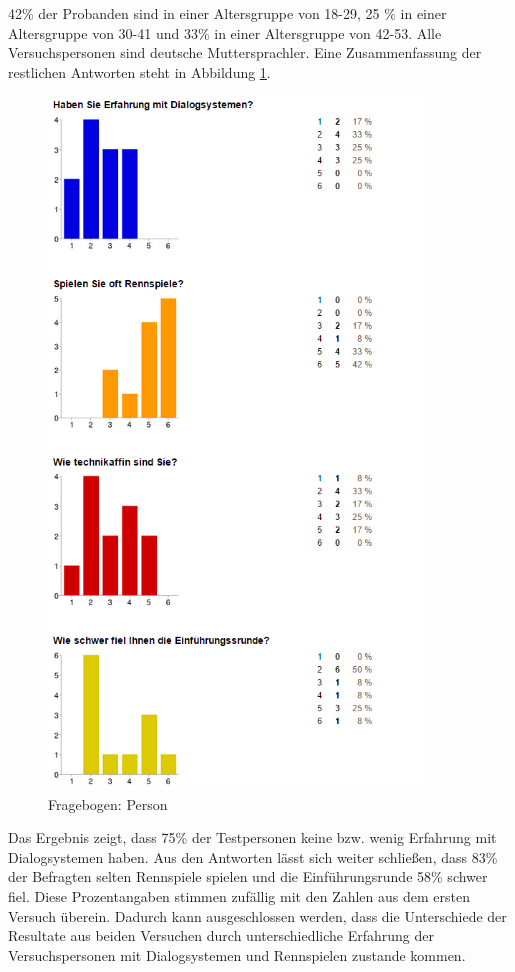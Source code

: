 \documentclass[12pt,a4paper]{scrartcl}
\begin{document}
42\% der Probanden sind in einer Altersgruppe von 18-29, 25 \% in einer Altersgruppe von 30-41 und 33\% in einer Altersgruppe von 42-53. Alle Versuchspersonen sind deutsche Muttersprachler. 
Eine Zusammenfassung der restlichen Antworten steht in Abbildung \ref{fbpersonaus2}.


\begin{figure}[H]
\begin{center}
\includegraphics[width=10cm]{person2.png}
\caption{Fragebogen: Person}
\label{fbpersonaus2}
\end{center}
\end{figure}
\newpage

Das Ergebnis zeigt, dass 75\% der Testpersonen keine bzw. wenig Erfahrung mit Dialogsystemen haben. Aus den Antworten lässt sich weiter schließen, dass 83\% der Befragten selten Rennspiele spielen und die Einführungsrunde 58\% schwer fiel. Diese Prozentangaben stimmen zufällig mit den Zahlen aus dem ersten Versuch überein. Dadurch kann ausgeschlossen werden, dass die Unterschiede der Resultate aus beiden Versuchen durch unterschiedliche Erfahrung der Versuchspersonen mit Dialogsystemen und Rennspielen zustande kommen. 
\end{document}
